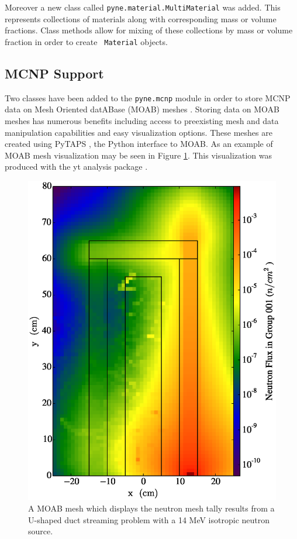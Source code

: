 \documentclass{anstrans}
\begin{document}
Moreover a new class called \texttt{pyne.material.MultiMaterial} was added.  This
represents collections of materials along with corresponding mass or
volume fractions.  Class methods allow for mixing of these collections by mass
or volume fraction in order to create \texttt{ Material} objects.

\subsection{MCNP Support}

Two classes have been added to the \texttt{pyne.mcnp} module in order to store
MCNP data on Mesh Oriented datABase (MOAB) meshes \cite{tautges_moab:_2004}.
Storing data on MOAB meshes has numerous benefits including access to preexisting
mesh and data manipulation capabilities and easy visualization options. These
meshes are created using PyTAPS \cite{pytaps}, the Python interface to MOAB.
As an example of MOAB mesh visualization may be seen in Figure \ref{moabexp}.
This visualization was produced with the yt analysis package \cite{ytpaper}.

\begin{figure}[htbp]
\begin{center}
\includegraphics[scale=0.35]{moab_example.eps}
\end{center}
\caption{A MOAB mesh which displays the neutron mesh tally results from a U-shaped 
         duct streaming problem with a 14 MeV isotropic neutron source.}
\label{moabexp}
\end{figure}
\end{document}
